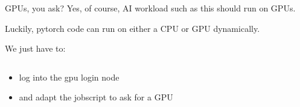 \documentclass[
  10pt,
  ignorenonframetext,
  aspectratio=169,handout]{beamer}
\newenvironment{Shaded}{\begin{snugshade}}{\end{snugshade}}
\newcommand{\ExtensionTok}[1]{\textcolor[rgb]{0.80,0.80,0.80}{#1}}
\newcommand{\KeywordTok}[1]{\textcolor[rgb]{0.94,0.87,0.69}{#1}}
\newcommand{\NormalTok}[1]{\textcolor[rgb]{0.80,0.80,0.80}{#1}}
\newcommand{\VariableTok}[1]{\textcolor[rgb]{0.80,0.80,0.80}{#1}}
\providecommand{\tightlist}{%
  \setlength{\itemsep}{0pt}\setlength{\parskip}{0pt}}
\begin{document}
\begin{frame}[fragile]{GPUs, you ask?}
\label{gpus-you-ask}
Yes, of course, AI workload such as this should run on GPUs.

\pause

Luckily, pytorch code can run on either a CPU or GPU dynamically.

\pause

We just have to:

\pause

\begin{columns}[T]
\begin{column}{0.47\linewidth}\setlength{\parskip}{0.5\baselineskip}
\begin{itemize}
\tightlist
\item
  log into the gpu login node
\end{itemize}

\begin{Shaded}
\end{Shaded}

\pause

\begin{itemize}
\tightlist
\item
  and adapt the jobscript to ask for a GPU
\end{itemize}

\begin{Shaded}
\end{Shaded}
\end{column}

\begin{column}{0.47\linewidth}\setlength{\parskip}{0.5\baselineskip}
\pause

\vspace{\baselineskip} \vspace{\baselineskip} \vspace{\baselineskip} \vspace{\baselineskip} \vspace{\baselineskip} \vspace{\baselineskip} \vspace{\baselineskip}


\end{column}
\end{columns}
\end{frame}
\end{document}
